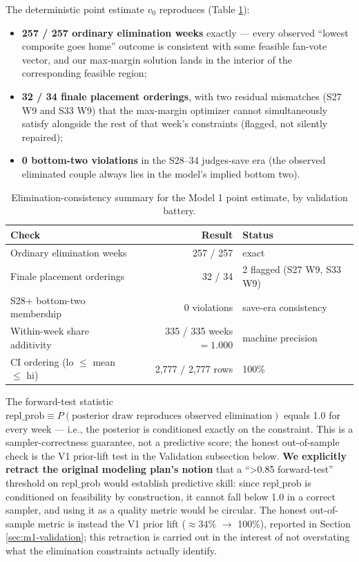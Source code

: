 \documentclass{article}
\begin{document}
The deterministic point estimate $v_0$ reproduces (Table \ref{tab:m1-consistency}):
\begin{itemize}
  \item \textbf{257 / 257 ordinary elimination weeks} exactly --- every observed ``lowest composite goes home'' outcome is consistent with some feasible fan-vote vector, and our max-margin solution lands in the interior of the corresponding feasible region;
  \item \textbf{32 / 34 finale placement orderings}, with two residual mismatches (S27 W9 and S33 W9) that the max-margin optimizer cannot simultaneously satisfy alongside the rest of that week's constraints (flagged, not silently repaired);
  \item \textbf{0 bottom-two violations} in the S28--34 judges-save era (the observed eliminated couple always lies in the model's implied bottom two).
\end{itemize}

\begin{table}[H]
\centering
\caption{Elimination-consistency summary for the Model 1 point estimate, by validation battery.}
\label{tab:m1-consistency}
\begin{tabular}{lrl}
\toprule
Check & Result & Status \\
\midrule
Ordinary elimination weeks & 257 / 257 & exact \\
Finale placement orderings & 32 / 34 & 2 flagged (S27 W9, S33 W9) \\
S28+ bottom-two membership & 0 violations & save-era consistency \\
Within-week share additivity & 335 / 335 weeks $= 1.000$ & machine precision \\
CI ordering (lo $\le$ mean $\le$ hi) & 2{,}777 / 2{,}777 rows & 100\% \\
\bottomrule
\end{tabular}
\end{table}

The forward-test statistic $\mathrm{repl\_prob} \equiv P(\text{posterior draw reproduces observed elimination})$ equals 1.0 for every week --- i.e., the posterior is conditioned exactly on the constraint. This is a sampler-correctness guarantee, not a predictive score; the honest out-of-sample check is the V1 prior-lift test in the Validation subsection below. \textbf{We explicitly retract the original modeling plan's notion} that a ``\textgreater 0.85 forward-test'' threshold on $\mathrm{repl\_prob}$ would establish predictive skill: since $\mathrm{repl\_prob}$ is conditioned on feasibility by construction, it cannot fall below 1.0 in a correct sampler, and using it as a quality metric would be circular. The honest out-of-sample metric is instead the V1 prior lift ($\approx 34\%$ $\to$ 100\%), reported in Section \ref{sec:m1-validation}; this retraction is carried out in the interest of not overstating what the elimination constraints actually identify.
\end{document}
